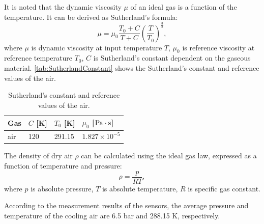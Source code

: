 \documentclass[preprint,5p,twocolumn,11pt,sort&compress]{elsarticle}
\begin{document}
It is noted that the dynamic viscosity $\mu$ of an ideal gas is a function of the temperature. It can be derived as Sutherland's formula:
\[\mu  = {\mu _0}\frac{{{T_0} + C}}{{T + C}}{\left( {\frac{T}{{{T_0}}}} \right)^{\frac{3}{2}}},\]
where $\mu$ is dynamic viscosity at input temperature $T$,
$\mu_0$ is reference viscosity at reference temperature $T_0$,
$C$ is Sutherland's constant dependent on the gaseous material.
\autoref{tab:SutherlandConstant} shows the Sutherland's constant and reference values of the air.
\begin{table}[htbp]
  \centering
  \caption{Sutherland's constant and reference values of the air.}
    \begin{tabular}{p{1.5cm}p{1.5cm}p{1.5cm}p{2cm}}
    \toprule
    Gas   & $C$ [K] & $T_0$ [K] & $\mu_0$ [$\rm{Pa\cdot s}$] \\
    \midrule
    air   & 120   & 291.15 & $1.827\times 10^{-5}$ \\
    \bottomrule
    \end{tabular}%
  \label{tab:SutherlandConstant}%
\end{table}%

The density of dry air $\rho$ can be calculated using the ideal gas law, expressed as a function of temperature and pressure:
\begin{equation}
\rho  = \frac{p}{{RT}},
\label{Equ:AirDensity}
\end{equation}
where
$p$ is absolute pressure,
$T$ is absolute temperature,
$R$ is specific gas constant.

According to the measurement results of the sensors, the average pressure and temperature of the cooling air are 6.5 bar and 288.15 K, respectively.
\end{document}
